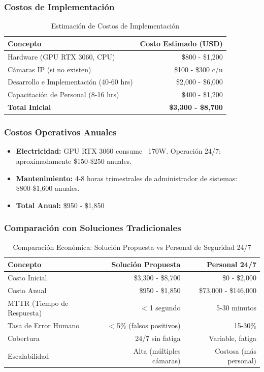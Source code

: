 \documentclass[12pt, a4paper]{article}
\begin{document}
\begin{itemize}
\subsubsection{Costos de Implementación}
\begin{table}[h!]
\centering
\begin{tabular}{|l|r|}
\hline
\textbf{Concepto} & \textbf{Costo Estimado (USD)} \\ \hline
Hardware (GPU RTX 3060, CPU) & \$800 - \$1,200 \\ \hline
Cámaras IP (si no existen) & \$100 - \$300 c/u \\ \hline
Desarrollo e Implementación (40-60 hrs) & \$2,000 - \$6,000 \\ \hline
Capacitación de Personal (8-16 hrs) & \$400 - \$1,200 \\ \hline
\textbf{Total Inicial} & \textbf{\$3,300 - \$8,700} \\ \hline
\end{tabular}
\caption{Estimación de Costos de Implementación}
\label{tab:costos}
\end{table}

\subsubsection{Costos Operativos Anuales}
\begin{itemize}
\item \textbf{Electricidad:} GPU RTX 3060 consume ~170W. Operación 24/7: aproximadamente \$150-\$250 anuales.
\item \textbf{Mantenimiento:} 4-8 horas trimestrales de administrador de sistemas: \$800-\$1,600 anuales.
\item \textbf{Total Anual:} \$950 - \$1,850
\end{itemize}

\subsubsection{Comparación con Soluciones Tradicionales}
\begin{table}[h!]
\centering
\begin{tabular}{|l|r|r|}
\hline
\textbf{Concepto} & \textbf{Solución Propuesta} & \textbf{Personal 24/7} \\ \hline
Costo Inicial & \$3,300 - \$8,700 & \$0 - \$2,000 \\ \hline
Costo Anual & \$950 - \$1,850 & \$73,000 - \$146,000 \\ \hline
MTTR (Tiempo de Respuesta) & < 1 segundo & 5-30 minutos \\ \hline
Tasa de Error Humano & < 5\% (falsos positivos) & 15-30\% \\ \hline
Cobertura & 24/7 sin fatiga & Variable, fatiga \\ \hline
Escalabilidad & Alta (múltiples cámaras) & Costosa (más personal) \\ \hline
\end{tabular}
\caption{Comparación Económica: Solución Propuesta vs Personal de Seguridad 24/7}
\label{tab:comparacion}
\end{table}


\end{itemize}
\end{document}
